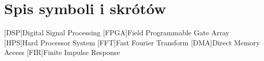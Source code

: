 \chapter*{Spis symboli i skrótów}
\begin{acronym}[TDMA]
[DSP]{Digital Signal Processing}
[FPGA]{Field Programmable Gate Array}
[HPS]{Hard Processor System}
[FFT]{Fast Fourier Transform}
[DMA]{Direct Memory Access}
[FIR]{Finite Impulse Response}
\end{acronym}